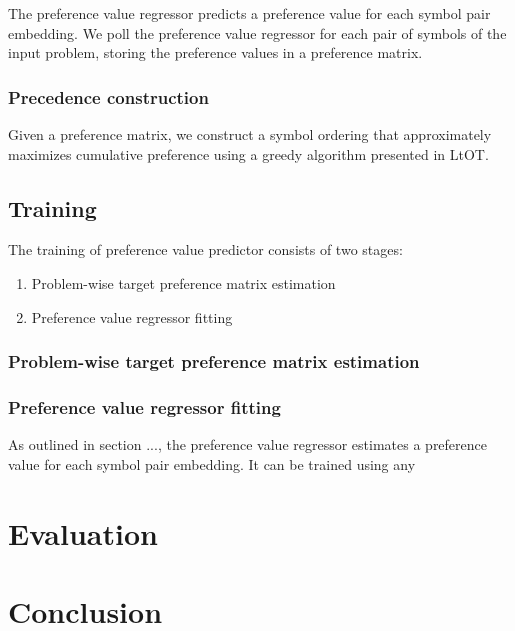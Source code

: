 The preference value regressor predicts a preference value for each symbol pair embedding.
We poll the preference value regressor for each pair of symbols of the input problem,
storing the preference values in a preference matrix.

\subsubsection{Precedence construction}

Given a preference matrix, we construct a symbol ordering
that approximately maximizes cumulative preference
using a greedy algorithm presented in LtOT.

\subsection{Training}

The training of preference value predictor consists of two stages:

\begin{enumerate}
	\item Problem-wise target preference matrix estimation
	\item Preference value regressor fitting
\end{enumerate}

\subsubsection{Problem-wise target preference matrix estimation}



\subsubsection{Preference value regressor fitting}

As outlined in section ...,
the preference value regressor estimates a preference value for each symbol pair embedding.
It can be trained using any 

\section{Evaluation}

\section{Conclusion}


